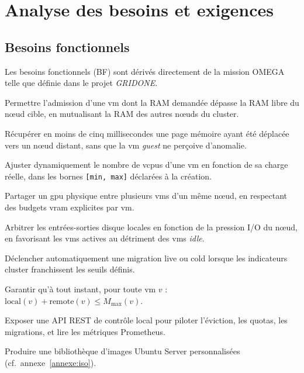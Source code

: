\section{Analyse des besoins et exigences}
\label{sec:besoins}

\subsection{Besoins fonctionnels}

Les besoins fonctionnels (BF) sont dérivés directement de la mission OMEGA telle que définie dans le projet \emph{GRIDONE}.

\begin{description}[leftmargin=2.2cm,style=nextline]
    \item[BF-01.] Permettre l'admission d'une \acrshort{vm} dont la RAM demandée dépasse la RAM libre du nœud cible, en mutualisant la RAM des autres nœuds du cluster.
    \item[BF-02.] Récupérer en moins de cinq millisecondes une page mémoire ayant été déplacée vers un nœud distant, sans que la \acrshort{vm} \emph{guest} ne perçoive d'anomalie.
    \item[BF-03.] Ajuster dynamiquement le nombre de \acrshort{vcpu}s d'une \acrshort{vm} en fonction de sa charge réelle, dans les bornes \texttt{[min, max]} déclarées à la création.
    \item[BF-04.] Partager un \acrshort{gpu} physique entre plusieurs \acrshort{vm}s d'un même nœud, en respectant des budgets \acrshort{vram} explicites par \acrshort{vm}.
    \item[BF-05.] Arbitrer les entrées-sorties disque locales en fonction de la pression I/O du nœud, en favorisant les \acrshort{vm}s actives au détriment des \acrshort{vm}s \emph{idle}.
    \item[BF-06.] Déclencher automatiquement une migration live ou cold lorsque les indicateurs cluster franchissent les seuils définis.
    \item[BF-07.] Garantir qu'à tout instant, pour toute \acrshort{vm} $v$ : $\text{local}(v) + \text{remote}(v) \le M_{\max}(v)$.
    \item[BF-08.] Exposer une API REST de contrôle local pour piloter l'éviction, les quotas, les migrations, et lire les métriques Prometheus.
    \item[BF-09.] Produire une bibliothèque d'images Ubuntu Server personnalisées (cf.~annexe~\ref{annexe:iso}).
\end{description}

